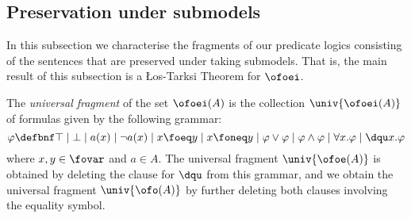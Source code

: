 
\subsection{Preservation under submodels}

In this subsection we characterise the fragments of our predicate logics 
consisting of the sentences that are preserved under taking submodels.
That is, the main result of this subsection is a {\L}os-Tarksi Theorem for
$\ofoei$.

\begin{definition}
The \emph{universal fragment} of the set $\ofoei(A)$ is the collection 
$\univ{\ofoei(A)}$ of formulas given by the following grammar:
\[
\varphi \defbnf
\top \mid \bot 
\mid a(x)
\mid \neg a(x)
\mid x \foeq y
\mid x \foneq y
\mid \varphi \lor \varphi
\mid \varphi \land \varphi
\mid \forall x.\varphi
\mid \dqu x.\varphi
\]
where $x,y\in \fovar$ and $a \in A$.
The universal fragment $\univ{\ofoe(A)}$ is obtained by deleting the clause for
$\dqu$ from this grammar, and we obtain the universal fragment $\univ{\ofo(A)}$ 
by further deleting both clauses involving the equality symbol.
\end{definition}

% 
% 

